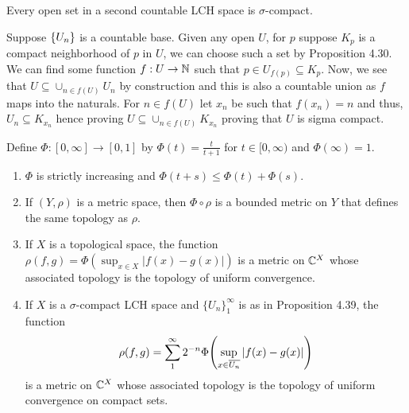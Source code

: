 \documentclass[12pt,a4paper]{article}
\begin{document}
\begin{problem}\label{prob:4-55}
Every open set in a second countable LCH space is $\sigma$-compact.
\end{problem}
\begin{solution}
Suppose $ \qty{U_n}$ is a countable base. 
Given any open $U$, for $p$ suppose $K_p$ is a compact neighborhood of $p$ in $U$, we can choose such a set by Proposition 4.30.  
We can find some function $f:U\to\mathbb{N}$ such that $p\in U_{f(p)} \subseteq K_p.$ 
Now, we see that $U \subseteq\cup_{n\in f(U)} U_n$ by construction and this is also a countable union as $f$ maps into the naturals. 
For $n\in f(U)$ let $x_n$ be such that $f(x_n)=n$ and thus, $U_n \subseteq K_{x_n}$ hence proving $U \subseteq\cup_{n\in f(U)}K_{x_n}$ proving that $U$ is sigma compact.
\end{solution}
\begin{problem}\label{prob:4-56}
Define $\Phi : [0,\infty] \to [0,1]$ by $\Phi(t) = \frac{t}{t+1}$ for $t \in [0,\infty)$ and $\Phi(\infty) = 1$.
\begin{enumerate}[label=\alph*.]
    \item $\Phi$ is strictly increasing and $\Phi(t+s) \le \Phi(t) + \Phi(s)$.
    \item If $(Y,\rho)$ is a metric space, then $\Phi \circ \rho$ is a bounded metric on $Y$ that defines the same topology as $\rho$.
    \item If $X$ is a topological space, the function $\rho(f,g) = \Phi(\sup_{x \in X} |f(x) - g(x)|)$ is a metric on $\mathbb{C}^X$ whose associated topology is the topology of uniform convergence.
    \item If $X$ is a $\sigma$-compact LCH space and $\{U_n\}_{1}^\infty$ is as in Proposition 4.39, the function
        \[ \rho(f,g) = \sum_{1}^\infty 2^{-n} \Phi\qty(\sup_{x \in \overline{U_n}} |f(x) - g(x)|) \]
    is a metric on $\mathbb{C}^X$ whose associated topology is the topology of uniform convergence on compact sets.
\end{enumerate}
\end{problem}
\end{document}
